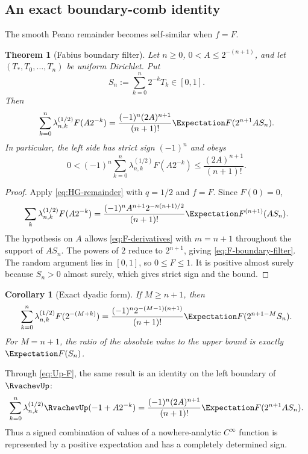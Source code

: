 \documentclass[11pt,oneside]{article}
\numberwithin{equation}{section}
\newtheorem{theorem}{Theorem}[section]
\newtheorem{corollary}[corollary]{Corollary}
\theoremstyle{definition}
\theoremstyle{remark}
\begin{document}
\subsection{An exact boundary-comb identity}

The smooth Peano remainder becomes self-similar when $f=F$.

\begin{theorem}[Fabius boundary filter]
Let $n\ge0$, $0<A\le2^{-(n+1)}$, and let
$(T_*,T_0,\ldots,T_n)$ be uniform Dirichlet.  Put
\begin{equation}
 S_n:=\sum_{k=0}^n2^{-k}T_k\in[0,1].
 \label{eq:Sn}
\end{equation}
Then
\begin{equation}
 \sum_{k=0}^n\lambda_{n,k}^{(1/2)}F(A2^{-k})
 =\frac{(-1)^n(2A)^{n+1}}{(n+1)!}
 \Expectation F(2^{n+1}AS_n).
 \label{eq:F-boundary-filter}
\end{equation}
In particular, the left side has strict sign $(-1)^n$ and obeys
\begin{equation}
 0<(-1)^n\sum_{k=0}^n\lambda_{n,k}^{(1/2)}F(A2^{-k})
 \le\frac{(2A)^{n+1}}{(n+1)!}.
 \label{eq:F-boundary-bound}
\end{equation}
\end{theorem}

\begin{proof}
Apply \eqref{eq:HG-remainder} with $q=1/2$ and $f=F$.  Since $F(0)=0$,
\[
 \sum_k\lambda_{n,k}^{(1/2)}F(A2^{-k})
 =\frac{(-1)^nA^{n+1}2^{-n(n+1)/2}}{(n+1)!}
 \Expectation F^{(n+1)}(AS_n).
\]
The hypothesis on $A$ allows \eqref{eq:F-derivatives} with $m=n+1$ throughout
the support of $AS_n$.  The powers of $2$ reduce to $2^{n+1}$, giving
\eqref{eq:F-boundary-filter}.  The random argument lies in $[0,1]$, so
$0\le F\le1$.  It is positive almost surely because $S_n>0$ almost surely,
which gives strict sign and the bound.
\end{proof}

\begin{corollary}[Exact dyadic form]
If $M\ge n+1$, then
\begin{equation}
 \sum_{k=0}^n\lambda_{n,k}^{(1/2)}F(2^{-(M+k)})
 =\frac{(-1)^n2^{-(M-1)(n+1)}}{(n+1)!}
 \Expectation F(2^{n+1-M}S_n).
 \label{eq:F-dyadic-filter}
\end{equation}
For $M=n+1$, the ratio of the absolute value to the upper bound is exactly
$\Expectation F(S_n)$.
\end{corollary}

Through \eqref{eq:Up-F}, the same result is an identity on the left boundary of
$\RvachevUp$:
\begin{equation}
 \sum_{k=0}^n\lambda_{n,k}^{(1/2)}
 \RvachevUp(-1+A2^{-k})
 =\frac{(-1)^n(2A)^{n+1}}{(n+1)!}
 \Expectation F(2^{n+1}AS_n).
 \label{eq:Up-boundary-filter}
\end{equation}
Thus a signed combination of values of a nowhere-analytic $C^\infty$ function
is represented by a positive expectation and has a completely determined
sign.
\end{document}
